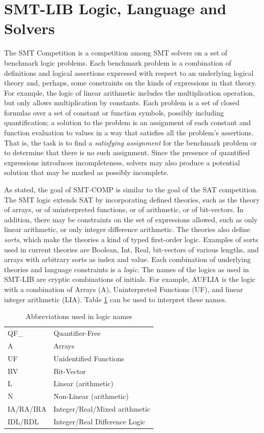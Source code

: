 \documentclass[twoside,11pt]{article}
\begin{document}
\section{SMT-LIB Logic, Language and Solvers}
\label{sec:context}

The SMT Competition is a competition among SMT solvers on a set of benchmark logic problems. Each benchmark problem is a combination of definitions and logical assertions expressed with respect to an underlying logical theory and, perhaps, some constraints on the kinds of expressions in that theory. For example,  the logic of linear arithmetic includes the multiplication operation, but only allows multiplication by constants. Each problem is a set of closed formulas over a set of constant or function symbols, possibly including quantification; a solution to the problem is an assignment of each constant and function evaluation to values in a way that satisfies all the problem's assertions. That is, the task is to find a \emph{satisfying assignment} for the benchmark problem or to determine that there is no such assignment. Since the presence of quantified expressions introduces incompleteness, solvers may also produce a potential solution that may be marked as possibly incomplete.

As stated, the goal of SMT-COMP is similar to the goal of the SAT competition. The SMT logic extends SAT by incorporating defined theories, such as the theory of arrays, or of uninterpreted functions, or of arithmetic, or of bit-vectors. In addition, there may be constraints on the set of expressions allowed, such as only linear arithmetic, or only integer difference arithmetic. The theories also define \emph{sorts}, which make the theories a kind of typed first-order logic. Examples of sorts used in current theories are Boolean, Int, Real, bit-vectors of various lengths, and arrays with arbitrary sorts as index and value. Each combination of underlying theories and language constraints is a \emph{logic}.
The names of the logics as used in SMT-LIB are cryptic combinations of initials. For example, AUFLIA is the logic with a
combination of Arrays (A), Uninterpreted Functions (UF), and linear integer arithmetic (LIA). Table \ref{logicAbbreviations} can be used to interpret these names.
\begin{table}
\begin{center}
\begin{tabular}{|l|l|}
\hline
QF\_ & Quantifier-Free \\
A & Arrays \\
UF & Unidentified Functions \\
BV & Bit-Vector \\
L & Linear (arithmetic) \\
N & Non-Linear (arithmetic) \\
IA/RA/IRA & Integer/Real/Mixed arithmetic \\
IDL/RDL & Integer/Real Difference Logic \\
\hline
\end{tabular}
\end{center}
\caption{Abbreviations used in logic names}
\label{logicAbbreviations}
\end{table}
\end{document}
